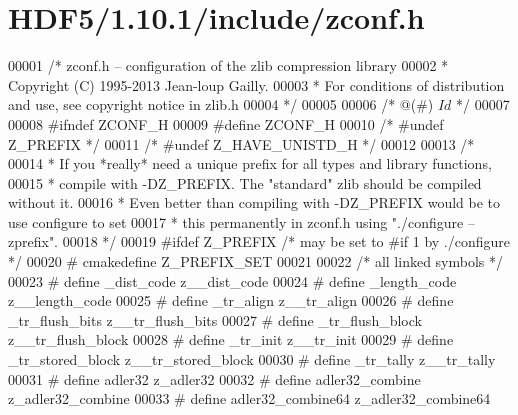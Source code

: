\hypertarget{_h_d_f5_21_810_81_2include_2zconf_8h_source}{}\section{H\+D\+F5/1.10.1/include/zconf.h}
\label{_h_d_f5_21_810_81_2include_2zconf_8h_source}

\begin{DoxyCode}
00001 \textcolor{comment}{/* zconf.h -- configuration of the zlib compression library}
00002 \textcolor{comment}{ * Copyright (C) 1995-2013 Jean-loup Gailly.}
00003 \textcolor{comment}{ * For conditions of distribution and use, see copyright notice in zlib.h}
00004 \textcolor{comment}{ */}
00005 
00006 \textcolor{comment}{/* @(#) $Id$ */}
00007 
00008 \textcolor{preprocessor}{#ifndef ZCONF\_H}
00009 \textcolor{preprocessor}{#define ZCONF\_H}
00010 \textcolor{comment}{/* #undef Z\_PREFIX */}
00011 \textcolor{comment}{/* #undef Z\_HAVE\_UNISTD\_H */}
00012 
00013 \textcolor{comment}{/*}
00014 \textcolor{comment}{ * If you *really* need a unique prefix for all types and library functions,}
00015 \textcolor{comment}{ * compile with -DZ\_PREFIX. The "standard" zlib should be compiled without it.}
00016 \textcolor{comment}{ * Even better than compiling with -DZ\_PREFIX would be to use configure to set}
00017 \textcolor{comment}{ * this permanently in zconf.h using "./configure --zprefix".}
00018 \textcolor{comment}{ */}
00019 \textcolor{preprocessor}{#ifdef Z\_PREFIX     }\textcolor{comment}{/* may be set to #if 1 by ./configure */}\textcolor{preprocessor}{}
00020 \textcolor{preprocessor}{#  cmakedefine Z\_PREFIX\_SET}
00021 
00022 \textcolor{comment}{/* all linked symbols */}
00023 \textcolor{preprocessor}{#  define \_dist\_code            z\_\_dist\_code}
00024 \textcolor{preprocessor}{#  define \_length\_code          z\_\_length\_code}
00025 \textcolor{preprocessor}{#  define \_tr\_align             z\_\_tr\_align}
00026 \textcolor{preprocessor}{#  define \_tr\_flush\_bits        z\_\_tr\_flush\_bits}
00027 \textcolor{preprocessor}{#  define \_tr\_flush\_block       z\_\_tr\_flush\_block}
00028 \textcolor{preprocessor}{#  define \_tr\_init              z\_\_tr\_init}
00029 \textcolor{preprocessor}{#  define \_tr\_stored\_block      z\_\_tr\_stored\_block}
00030 \textcolor{preprocessor}{#  define \_tr\_tally             z\_\_tr\_tally}
00031 \textcolor{preprocessor}{#  define adler32               z\_adler32}
00032 \textcolor{preprocessor}{#  define adler32\_combine       z\_adler32\_combine}
00033 \textcolor{preprocessor}{#  define adler32\_combine64     z\_adler32\_combine64}

\end{DoxyCode}
